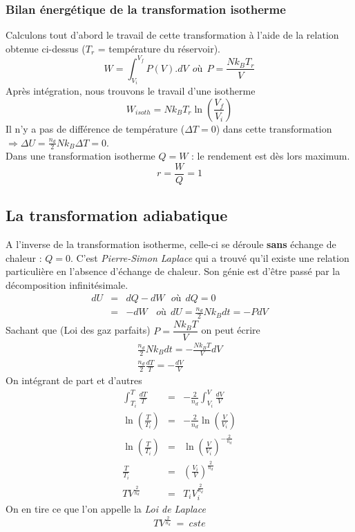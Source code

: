 \documentclass	[11pt, a4paper, openany]{book}
\begin{document}
\subsubsection{Bilan énergétique de la transformation isotherme}
Calculons tout d'abord le travail de cette transformation à l'aide de la relation obtenue ci-dessus ($T_r$ = température du réservoir).
\begin{equation}
W = \int_{V_i}^{V_f} P(V).dV\ \ où\ \ P = \frac{Nk_BT_r}{V}
\end{equation}
Après intégration, nous trouvons le travail d'une isotherme
\begin{equation}
W_{isoth} = Nk_BT_r \ln\left(\frac{V_f}{V_i}\right)
\end{equation}
Il n'y a pas de différence de température ($\Delta T = 0$) dans cette transformation $\Rightarrow \Delta U = \frac{n_d}{2}Nk_B\Delta T = 0$.\\
Dans une transformation isotherme $Q = W$ : le rendement est dès lors maximum.
\begin{equation}
r = \frac{W}{Q} = 1
\end{equation}

\subsection{La transformation adiabatique}
A l'inverse de la transformation isotherme, celle-ci se déroule \textbf{sans} échange de chaleur : $Q = 0$. C'est \textit{Pierre-Simon Laplace} qui a trouvé qu'il existe une relation particulière en l'absence d'échange de chaleur. Son génie est d'être passé par la décomposition infinitésimale.
\begin{eqnarray}
dU &=& dQ - dW\ \ \ où\ \ dQ = 0\\
  &=& - dW \ \ \ \ où\ \ dU = \frac{n_d}{2}Nk_B dt = - PdV
\end{eqnarray}
Sachant que (Loi des gaz parfaits) $P = \dfrac{Nk_BT}{V}$ on peut écrire 
\begin{eqnarray}
\frac{n_d}{2}Nk_Bdt = - \frac{Nk_BT}{V}dV\\
\frac{n_d}{2}\frac{dT}{T} = - \frac{dV}{V}
\end{eqnarray}
On intégrant de part et d'autres
\begin{eqnarray}
\int_{T_i}^{T} \frac{dT}{T} &=& -\frac{2}{n_d}\int_{V_i}^{V} \frac{dV}{V}\\
\ln\left(\frac{T}{T_i}\right) &=& -\frac{2}{n_d}\ln\left(\frac{V}{V_i}\right)\\
\ln\left(\frac{T}{T_i}\right) &=& \ln\left(\frac{V}{V_i}\right)^{-\frac{2}{n_d}}\\
\frac{T}{T_i} &=& \left(\frac{V_i}{V}\right)^{\frac{2}{n_d}}\\
TV^{\frac{2}{n_d}} &=& T_iV_i^{\frac{2}{n_d}}
\end{eqnarray}
On en tire ce que l'on appelle la \textit{Loi de Laplace}
\begin{equation}
TV^{\frac{2}{n_d}}\ =\ cste
\end{equation}
\end{document}
